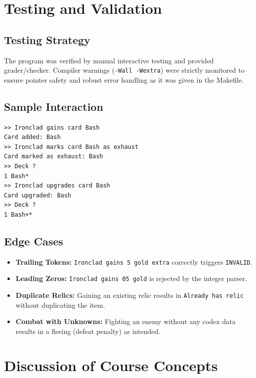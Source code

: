 \documentclass[a4paper,12pt]{article}
\begin{document}
\section{Testing and Validation}

\subsection{Testing Strategy}

The program was verified by manual interactive testing and provided grader/checker. Compiler warnings (\texttt{-Wall -Wextra}) were strictly monitored to ensure pointer safety and robust error handling as it was given in the Makefile.

\subsection{Sample Interaction}

\begin{verbatim}
>> Ironclad gains card Bash
Card added: Bash
>> Ironclad marks card Bash as exhaust
Card marked as exhaust: Bash
>> Deck ?
1 Bash*
>> Ironclad upgrades card Bash
Card upgraded: Bash
>> Deck ?
1 Bash+*
\end{verbatim}

\subsection{Edge Cases}

\begin{itemize}[leftmargin=1.5em]
    \item \textbf{Trailing Tokens:} \texttt{Ironclad gains 5 gold extra} correctly triggers \texttt{INVALID}.
    \item \textbf{Leading Zeros:} \texttt{Ironclad gains 05 gold} is rejected by the integer parser.
    \item \textbf{Duplicate Relics:} Gaining an existing relic results in \texttt{Already has relic} without duplicating the item.
    \item \textbf{Combat with Unknowns:} Fighting an enemy without any codex data results in a fleeing (defeat penalty) as intended.
    
\end{itemize}

\section{Discussion of Course Concepts}
\end{document}
